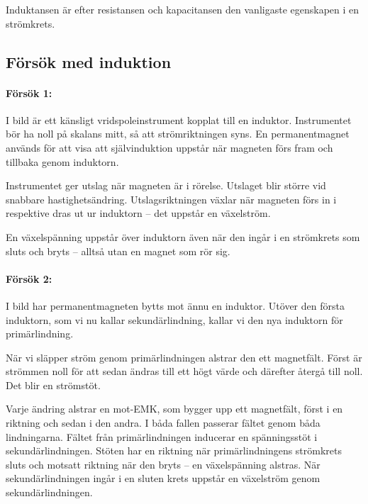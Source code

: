 Induktansen är efter resistansen och kapacitansen den vanligaste egenskapen i
en strömkrets.

\subsection{Försök med induktion}


\paragraph{Försök 1:}
I bild  är ett känsligt vridspoleinstrument kopplat
till en induktor.
Instrumentet bör ha noll på skalans mitt, så att strömriktningen syns.
En permanentmagnet används för att visa att självinduktion uppstår när
magneten förs fram och tillbaka genom induktorn.

Instrumentet ger utslag när magneten är i rörelse. Utslaget blir större vid
snabbare hastighetsändring. Utslagsriktningen växlar när magneten förs in i
respektive dras ut ur induktorn -- det uppstår en växelström.

En växelspänning uppstår över induktorn även när den ingår i en strömkrets som
sluts och bryts -- alltså utan en magnet som rör sig.

\paragraph{Försök 2:}
I bild  har permanentmagneten bytts mot ännu en
induktor.
Utöver den första induktorn, som vi nu kallar sekundärlindning, kallar vi den
nya induktorn för primärlindning.

När vi släpper ström genom primärlindningen alstrar den ett magnetfält.
Först är strömmen noll för att sedan ändras till ett högt värde och därefter
återgå till noll. Det blir en strömstöt.

Varje ändring alstrar en mot-EMK, som bygger upp ett magnetfält, först i en
riktning och sedan i den andra. I båda fallen passerar fältet genom båda
lindningarna. Fältet från primärlindningen inducerar en spänningsstöt i
sekundärlindningen. Stöten har en riktning när primärlindningens strömkrets
sluts och motsatt riktning när den bryts -- en växelspänning alstras.
När sekundärlindningen ingår i en sluten krets uppstår en växelström genom
sekundärlindningen.

